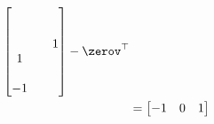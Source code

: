 \documentclass{ctexart}
\begin{document}
\begin{example} 
\begin{align*}
\begin{bmatrix}
                                                              &   &   \\
                                                              &   &   \\
                                                              &   & 1 \\
                                                           1  &   &   \\
                                                              &   &   \\
                                                           -1 &   &   \\
                                                       \end{bmatrix} - \zerov^\top \\
                       & = \begin{bmatrix}
                               -1 & 0 & 1
                           \end{bmatrix}
    \end{align*}


\end{example}
\end{document}
